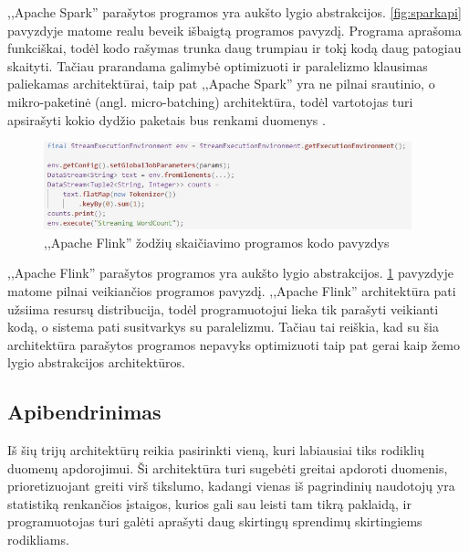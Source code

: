 \documentclass{VUMIFPSkursinis}
\begin{document}
,,Apache Spark'' parašytos programos yra aukšto lygio abstrakcijos. \ref{fig:sparkapi} pavyzdyje matome realu beveik išbaigtą programos pavyzdį. 
Programa aprašoma funkciškai, todėl kodo rašymas trunka daug trumpiau ir tokį kodą daug patogiau skaityti. Tačiau prarandama galimybė optimizuoti
ir paralelizmo klausimas paliekamas architektūrai, taip pat ,,Apache Spark'' yra ne pilnai srautinio, o mikro-paketinė (angl. micro-batching) 
architektūra, todėl vartotojas turi apsirašyti kokio dydžio paketais bus renkami duomenys \cite{shoro2015big}.

\begin{figure}[!htbp]
    \centering
    \includegraphics[width=0.95\textwidth]{img/FlinkAPI.jpg}
    \caption{,,Apache Flink'' žodžių skaičiavimo programos kodo pavyzdys}
    \label{fig:flinkapi}
\end{figure} \par

,,Apache Flink'' parašytos programos yra aukšto lygio abstrakcijos. \ref{fig:flinkapi} pavyzdyje matome pilnai veikiančios programos pavyzdį. ,,Apache Flink'' 
architektūra pati užsiima resursų distribucija, todėl programuotojui lieka tik parašyti veikianti kodą, o sistema pati susitvarkys su paralelizmu. Tačiau 
tai reiškia, kad su šia architektūra parašytos programos nepavyks optimizuoti taip pat gerai kaip žemo lygio abstrakcijos architektūros.

\subsection{Apibendrinimas}
Iš šių trijų architektūrų reikia pasirinkti vieną, kuri labiausiai tiks rodiklių duomenų apdorojimui. Ši architektūra turi sugebėti greitai apdoroti duomenis,
prioretizuojant greiti virš tikslumo, kadangi vienas iš pagrindinių naudotojų yra statistiką renkančios įstaigos, kurios gali sau leisti tam tikrą paklaidą,
ir programuotojas turi galėti aprašyti daug skirtingų sprendimų skirtingiems rodikliams.\par
\end{document}
